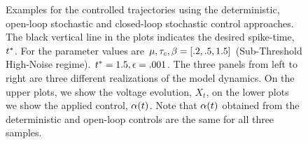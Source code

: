 \documentclass[12pt]{iopart}
\begin{document}
\begin{figure}[h]
\begin{center}
\caption[]{Examples for the controlled trajectories using the
deterministic, open-loop stochastic and closed-loop stochastic control
approaches. The black vertical line in the plots indicates the desired spike-time, ${ t^* }$.
For the parameter values are ${\mu }, { \tau_{c} }, {\beta} = [.2, .5,  1.5]$ (Sub-Threshold
High-Noise regime). ${ t^* } = 1.5, {\epsilon} = .001$. The three panels from left to
right are three different realizations of the model dynamics. On the upper
plots, we show the voltage evolution, $X_t$, on the lower plots we show the
applied control, ${\alpha}(t)$. Note that ${\alpha}(t)$ obtained from the
deterministic and open-loop controls are the same for all three samples.}
\label{fig:control_trajectories_examples}
\end{center}
\end{figure}
\end{document}
